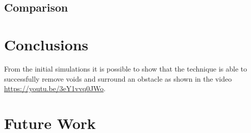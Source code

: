 \documentclass[12pt,a4paper]{IEEEtran}
\begin{document}







\subsection{Comparison}

\section{Conclusions}\label{conclusions}
From the initial simulations it is possible to show that the technique is able to successfully remove voids and surround an obstacle as shown in the video \href{https://youtu.be/3eY1vvq0JWo}{https://youtu.be/3eY1vvq0JWo}.

\section{Future Work}



\end{document}
